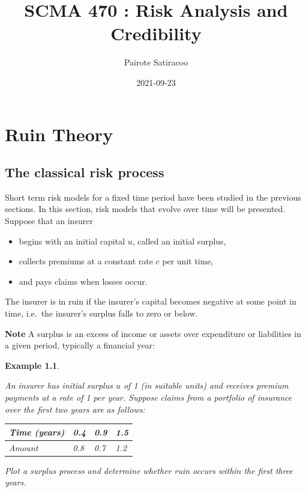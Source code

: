 \documentclass[landscape, 20pt]{extreport}
\title{\textbf{SCMA 470 : Risk Analysis and Credibility}}
\author{Pairote Satiracoo}
\date{2021-09-23}
\theoremstyle{definition}
\theoremstyle{definition}
\newtheorem{example}{Example}[chapter]
\theoremstyle{definition}
\theoremstyle{definition}
\theoremstyle{remark}
\begin{document}
\setcounter{chapter}{4}



\hypertarget{ruin-theory}{%
\chapter{Ruin Theory}\label{ruin-theory}}

\hypertarget{the-classical-risk-process}{%
\section{The classical risk process}\label{the-classical-risk-process}}

Short term risk models for a fixed time period have been studied in the
previous sections. In this section, risk models that evolve over time
will be presented. Suppose that an insurer

\begin{itemize}
\item
  begins with an initial capital \(u\), called an initial surplus,
\item
  collects premiums at a constant rate \(c\) per unit time,
\item
  and pays claims when losses occur.
\end{itemize}

The insurer is in ruin if the insurer's capital becomes negative at some
point in time, i.e.~the insurer's surplus falls to zero or below.

\textbf{Note} A surplus is an excess of income or assets over expenditure or
liabilities in a given period, typically a financial year:

\newpage \begin{example}
\protect\hypertarget{exm:ExampleSurplus}{}\label{exm:ExampleSurplus}

\emph{An insurer has initial surplus \(u\) of 1 (in suitable
units) and receives premium payments at a rate of 1 per year. Suppose
claims from a portfolio of insurance over the first two years are as
follows:}

\begin{longtable}[]{@{}llll@{}}
\toprule
\emph{Time (years)} & \emph{0.4} & \emph{0.9} & \emph{1.5} \\
\midrule
\endhead
\emph{Amount} & \emph{0.8} & \emph{0.7} & \emph{1.2} \\
\bottomrule
\end{longtable}

\emph{Plot a surplus process and determine whether ruin occurs within the
first three years.}

\end{example}
\end{document}

